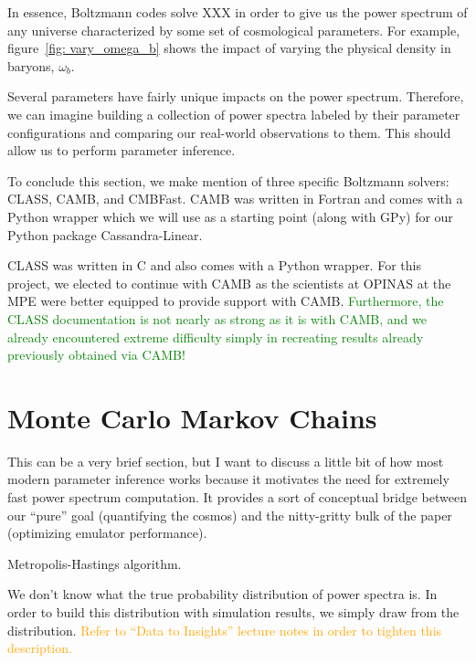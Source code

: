 In essence, Boltzmann codes solve XXX in order to give us the power spectrum
of any universe characterized by some set of cosmological parameters. For
example, figure~\ref{fig: vary_omega_b} shows the impact of varying the
physical density in baryons, $\omega_b$. 

Several parameters have fairly unique impacts on the power spectrum.
Therefore, we can imagine building a collection of power spectra labeled by
their parameter configurations and comparing our real-world observations to
them. This should allow us to perform parameter inference.

To conclude this section, we make mention of three specific Boltzmann solvers: 
CLASS, CAMB, and CMBFast.
CAMB was written in Fortran and comes with a Python wrapper which we
will use as a starting point (along with GPy) for our Python package
Cassandra-Linear.

CLASS was written in C and also comes with a Python wrapper.
For this project, we elected to continue with CAMB as the scientists at
OPINAS at the MPE were better equipped to provide support with CAMB.
\textcolor{green}{Furthermore, the CLASS documentation
is not nearly as strong as it is with CAMB, and we already encountered
extreme difficulty simply in recreating results already previously obtained
via CAMB!}

\section{Monte Carlo Markov Chains}

This can be a very brief section, but I want to discuss a little bit of how most modern parameter inference works because it motivates the need for extremely fast power spectrum computation. It provides a sort of conceptual bridge between our ``pure'' goal (quantifying the cosmos) and the nitty-gritty bulk of the paper (optimizing emulator performance).

Metropolis-Hastings algorithm.

We don't know what the true probability distribution of power spectra is. In order to build this distribution with simulation results, we simply draw from the distribution. \textcolor{orange}{Refer to ``Data to Insights'' lecture notes in order to tighten this description.}

